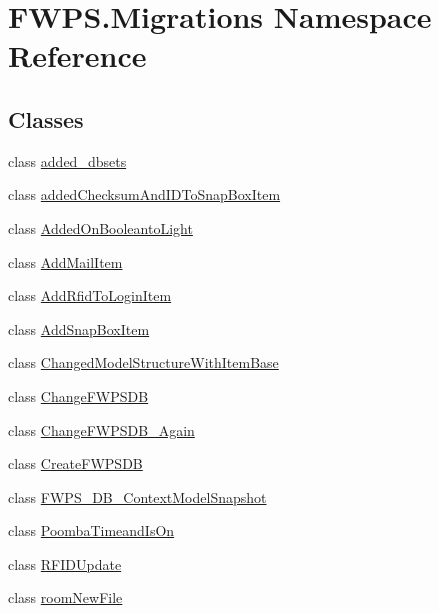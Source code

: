 \hypertarget{namespace_f_w_p_s_1_1_migrations}{}\section{F\+W\+P\+S.\+Migrations Namespace Reference}
\label{namespace_f_w_p_s_1_1_migrations}
\subsection*{Classes}
\begin{DoxyCompactItemize}
\item 
class \mbox{\hyperlink{class_f_w_p_s_1_1_migrations_1_1added__dbsets}{added\+\_\+dbsets}}
\item 
class \mbox{\hyperlink{class_f_w_p_s_1_1_migrations_1_1added_checksum_and_i_d_to_snap_box_item}{added\+Checksum\+And\+I\+D\+To\+Snap\+Box\+Item}}
\item 
class \mbox{\hyperlink{class_f_w_p_s_1_1_migrations_1_1_added_on_booleanto_light}{Added\+On\+Booleanto\+Light}}
\item 
class \mbox{\hyperlink{class_f_w_p_s_1_1_migrations_1_1_add_mail_item}{Add\+Mail\+Item}}
\item 
class \mbox{\hyperlink{class_f_w_p_s_1_1_migrations_1_1_add_rfid_to_login_item}{Add\+Rfid\+To\+Login\+Item}}
\item 
class \mbox{\hyperlink{class_f_w_p_s_1_1_migrations_1_1_add_snap_box_item}{Add\+Snap\+Box\+Item}}
\item 
class \mbox{\hyperlink{class_f_w_p_s_1_1_migrations_1_1_changed_model_structure_with_item_base}{Changed\+Model\+Structure\+With\+Item\+Base}}
\item 
class \mbox{\hyperlink{class_f_w_p_s_1_1_migrations_1_1_change_f_w_p_s_d_b}{Change\+F\+W\+P\+S\+DB}}
\item 
class \mbox{\hyperlink{class_f_w_p_s_1_1_migrations_1_1_change_f_w_p_s_d_b___again}{Change\+F\+W\+P\+S\+D\+B\+\_\+\+Again}}
\item 
class \mbox{\hyperlink{class_f_w_p_s_1_1_migrations_1_1_create_f_w_p_s_d_b}{Create\+F\+W\+P\+S\+DB}}
\item 
class \mbox{\hyperlink{class_f_w_p_s_1_1_migrations_1_1_f_w_p_s___d_b___context_model_snapshot}{F\+W\+P\+S\+\_\+\+D\+B\+\_\+\+Context\+Model\+Snapshot}}
\item 
class \mbox{\hyperlink{class_f_w_p_s_1_1_migrations_1_1_poomba_timeand_is_on}{Poomba\+Timeand\+Is\+On}}
\item 
class \mbox{\hyperlink{class_f_w_p_s_1_1_migrations_1_1_r_f_i_d_update}{R\+F\+I\+D\+Update}}
\item 
class \mbox{\hyperlink{class_f_w_p_s_1_1_migrations_1_1room_new_file}{room\+New\+File}}
\end{DoxyCompactItemize}
